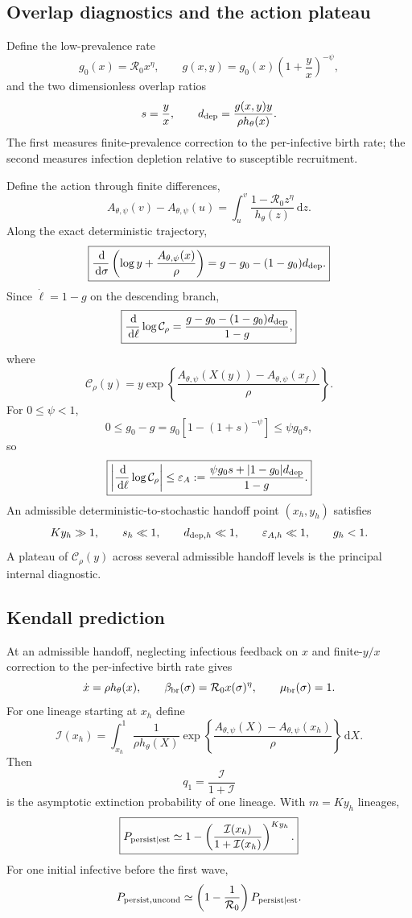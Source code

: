 \documentclass[11pt]{article}
\newcommand{\Rzero}{\mathcal R_0}
\newcommand{\hth}{h_\theta}
\newcommand{\Apsi}{A_{\theta,\psi}}
\newcommand{\xf}{x_f}
\newcommand{\dd}{\,\mathrm{d}}
\newcommand{\CalC}{\mathcal C_\rho}
\newcommand{\gh}{g_0}
\newcommand{\epsA}{\varepsilon_A}
\begin{document}
\subsection{Overlap diagnostics and the action plateau}
Define the low-prevalence rate
\[
\gh(x)=\Rzero x^\eta,
\qquad
 g(x,y)=\gh(x)\left(1+\frac yx\right)^{-\psi},
\]
and the two dimensionless overlap ratios
\[
s=\frac yx,
\qquad
 d_{\rm dep}=\frac{g(x,y)y}{\rho\hth(x)}.
\]
The first measures finite-prevalence correction to the per-infective birth rate; the second measures infection depletion relative to susceptible recruitment.

Define the action through finite differences,
\[
\Apsi(v)-\Apsi(u)
=\int_u^v\frac{1-\Rzero z^\eta}{\hth(z)}\dd z.
\]
Along the exact deterministic trajectory,
\[
\boxed{
\frac{\dd}{\dd\sigma}
\left(
\log y+\frac{\Apsi(x)}{\rho}
\right)
=
 g-\gh-(1-\gh)d_{\rm dep}.
}
\]
Since $\dot\ell=1-g$ on the descending branch,
\[
\boxed{
\frac{\dd}{\dd\ell}\log \CalC
=
\frac{g-\gh-(1-\gh)d_{\rm dep}}{1-g},
}
\]
where
\[
\boxed{
\CalC(y)
=y\exp\left\{\frac{\Apsi(X(y))-\Apsi(\xf)}{\rho}\right\}.
}
\]
For $0\leq\psi<1$,
\[
0\leq \gh-g
=\gh\left[1-(1+s)^{-\psi}\right]
\leq \psi\gh s,
\]
so
\[
\boxed{
\left|\frac{\dd}{\dd\ell}\log\CalC\right|
\leq
\epsA
:=
\frac{\psi\gh s+|1-\gh|d_{\rm dep}}{1-g}.
}
\]
An admissible deterministic-to-stochastic handoff point $(x_h,y_h)$ satisfies
\[
Ky_h\gg1,
\qquad
s_h\ll1,
\qquad
d_{{\rm dep},h}\ll1,
\qquad
\varepsilon_{A,h}\ll1,
\qquad
g_h<1.
\]
A plateau of $\CalC(y)$ across several admissible handoff levels is the principal internal diagnostic.

\subsection{Kendall prediction}
At an admissible handoff, neglecting infectious feedback on $x$ and finite-$y/x$ correction to the per-infective birth rate gives
\[
\dot x=\rho\hth(x),
\qquad
\beta_{\rm br}(\sigma)=\Rzero x(\sigma)^\eta,
\qquad
\mu_{\rm br}(\sigma)=1.
\]
For one lineage starting at $x_h$ define
\[
\boxed{
\mathcal I(x_h)
=
\int_{x_h}^{1}
\frac{1}{\rho\hth(X)}
\exp\left\{
\frac{\Apsi(X)-\Apsi(x_h)}{\rho}
\right\}\dd X.
}
\]
Then
\[
q_1=\frac{\mathcal I}{1+\mathcal I}
\]
is the asymptotic extinction probability of one lineage. With $m=Ky_h$ lineages,
\[
\boxed{
P_{\rm persist\mid est}
\simeq
1-\left(\frac{\mathcal I(x_h)}{1+\mathcal I(x_h)}\right)^{Ky_h}.
}
\]
For one initial infective before the first wave,
\[
P_{\rm persist,uncond}
\simeq
\left(1-\frac1{\Rzero}\right)P_{\rm persist\mid est}.
\]
\end{document}
